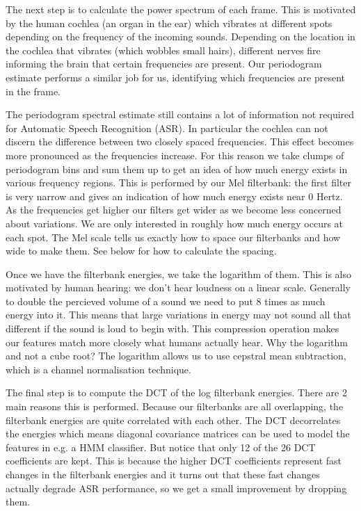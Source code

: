 The next step is to calculate the power spectrum of each frame. This is motivated by the human cochlea (an organ in the ear) which vibrates at different spots depending on the frequency of the incoming sounds. Depending on the location in the cochlea that vibrates (which wobbles small hairs), different nerves fire informing the brain that certain frequencies are present. Our periodogram estimate performs a similar job for us, identifying which frequencies are present in the frame.

The periodogram spectral estimate still contains a lot of information not required for Automatic Speech Recognition (ASR). In particular the cochlea can not discern the difference between two closely spaced frequencies. This effect becomes more pronounced as the frequencies increase. For this reason we take clumps of periodogram bins and sum them up to get an idea of how much energy exists in various frequency regions. This is performed by our Mel filterbank: the first filter is very narrow and gives an indication of how much energy exists near 0 Hertz. As the frequencies get higher our filters get wider as we become less concerned about variations. We are only interested in roughly how much energy occurs at each spot. The Mel scale tells us exactly how to space our filterbanks and how wide to make them. See below for how to calculate the spacing.

Once we have the filterbank energies, we take the logarithm of them. This is also motivated by human hearing: we don't hear loudness on a linear scale. Generally to double the percieved volume of a sound we need to put 8 times as much energy into it. This means that large variations in energy may not sound all that different if the sound is loud to begin with. This compression operation makes our features match more closely what humans actually hear. Why the logarithm and not a cube root? The logarithm allows us to use cepstral mean subtraction, which is a channel normalisation technique.

The final step is to compute the DCT of the log filterbank energies. There are 2 main reasons this is performed. Because our filterbanks are all overlapping, the filterbank energies are quite correlated with each other. The DCT decorrelates the energies which means diagonal covariance matrices can be used to model the features in e.g. a HMM classifier. But notice that only 12 of the 26 DCT coefficients are kept. This is because the higher DCT coefficients represent fast changes in the filterbank energies and it turns out that these fast changes actually degrade ASR performance, so we get a small improvement by dropping them.


